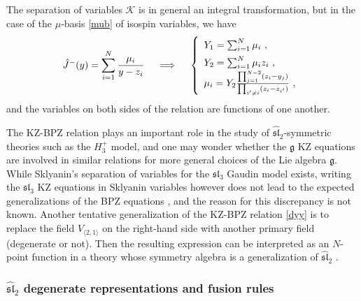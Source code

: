 \documentclass[12pt, a4paper, notitlepage, twoside]{report}
\numberwithin{equation}{section}
\theoremstyle{break}
\begin{document}
The separation of variables $\mathcal{K}$ is in general an integral transformation, but in the case of the $\mu$-basis \eqref{mub} of isospin variables, we have 
\begin{align}
\renewcommand{\arraystretch}{1.5}
 \hat{J}^-(y) = \sum_{i=1}^N \frac{\mu_i}{y-z_i} \quad \implies \quad \left\{\begin{array}{l}  Y_1 =\sum_{i=1}^N \mu_i\ , \\ Y_2 = \sum_{i=1}^N \mu_i z_i\ , \\ \mu_i = Y_2\frac{\prod_{j=1}^{N-2}(z_i-y_j)}{\prod_{i'\neq i}(z_i-z_{i'})}\ ,\end{array}\right. 
\label{my}
\end{align}
and the variables on both sides of the relation are functions of one another. 

The KZ-BPZ relation plays an important role in the study of $\widehat{\mathfrak{sl}}_2$-symmetric theories such as the $H_3^+$ model, and one may wonder whether the $\mathfrak{g}$ KZ equations are involved in similar relations for more general choices of the Lie algebra $\mathfrak{g}$.
While Sklyanin's separation of variables for the $\mathfrak{sl}_3$ Gaudin model exists, writing the $\mathfrak{sl}_3$ KZ equations in Sklyanin variables however does not lead to the expected generalizations of the BPZ equations \cite{rib08b}, and the reason for this discrepancy is not known. 
Another tentative generalization of the KZ-BPZ relation \eqref{dyy} is to replace the field $V_{\langle 2,1\rangle}$ on the right-hand side with another primary field (degenerate or not).
Then the resulting expression can be interpreted as an $N$-point function in a theory whose symmetry algebra is a generalization of $\widehat{\mathfrak{sl}}_2$ \cite{rib08}.


\subsubsection{\texorpdfstring{$\widehat{\mathfrak{sl}}_2$}{sl2} degenerate representations and fusion rules}
\end{document}
